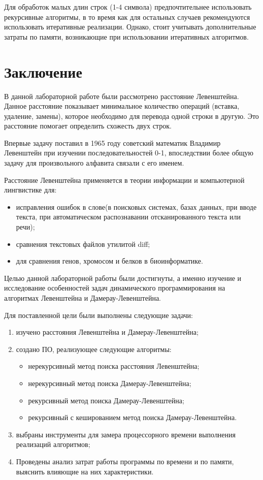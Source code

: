 \documentclass[a4paper,14pt, unknownkeysallowed]{bmstu}
\begin{document}
Для обработок малых длин строк (1-4 символа) предпочтительнее использовать рекурсивные алгоритмы, в то время как для остальных случаев рекомендуются использовать итеративные реализации. Однако, стоит учитывать дополнительные затраты по памяти, возникающие при использовании итеративных алгоритмов.

\chapter*{Заключение}
В данной лабораторной работе были рассмотрено расстояние Левенштейна. Данное расстояние показывает минимальное количество операций (вставка, удаление, замены), которое необходимо для перевода одной строки в другую. Это расстояние помогает определить схожесть двух строк.

Впервые задачу поставил в 1965 году советский математик Владимир Левенштейн при изучении последовательностей 0-1, впоследствии более общую задачу для произвольного алфавита связали с его именем.

Расстояние Левенштейна применяется в теории информации и компьютерной лингвистике для:
\begin{itemize}
	\item исправления ошибок в слове(в поисковых системах, базах данных, при вводе текста, при автоматическом распознавании отсканированного текста или речи);
	\item сравнения текстовых файлов утилитой diff;
	\item для сравнения генов, хромосом и белков в биоинформатике.
\end{itemize}

Целью данной лабораторной работы были достигнуты, а именно изучение и исследование особенностей задач динамического программирования на алгоритмах Левенштейна и Дамерау-Левенштейна.

Для поставленной цели были выполнены следующие задачи:
\begin{enumerate}[label={\arabic*)}]
	\item изучено расстояния Левенштейна и Дамерау-Левенштейна;
	\item создано ПО, реализующее следующие алгоритмы:
	\begin{itemize}
		\item нерекурсивный метод поиска расстояния Левенштейна;
		\item нерекурсивный метод поиска Дамерау-Левенштейна;
		\item рекурсивный метод поиска Дамерау-Левенштейна;
		\item  рекурсивный с кешированием метод поиска Дамерау-Левенштейна.
	\end{itemize}
	\item выбраны инструменты для замера процессорного времени выполнения реализаций алгоритмов;
	\item Проведены анализ затрат работы программы по времени и по памяти, выяснить влияющие на них характеристики.
\end{enumerate}
\end{document}
